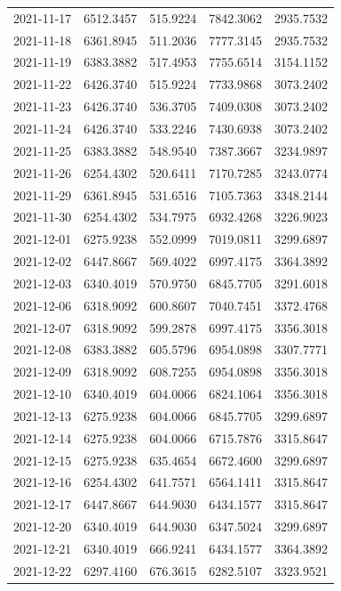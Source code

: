 \begin{footnotesize}
\begin{longtable}{lllll}
2021-11-17 & 6512.3457 & 515.9224 & 7842.3062 & 2935.7532 \\
2021-11-18 & 6361.8945 & 511.2036 & 7777.3145 & 2935.7532 \\
2021-11-19 & 6383.3882 & 517.4953 & 7755.6514 & 3154.1152 \\
2021-11-22 & 6426.3740 & 515.9224 & 7733.9868 & 3073.2402 \\
2021-11-23 & 6426.3740 & 536.3705 & 7409.0308 & 3073.2402 \\
2021-11-24 & 6426.3740 & 533.2246 & 7430.6938 & 3073.2402 \\
2021-11-25 & 6383.3882 & 548.9540 & 7387.3667 & 3234.9897 \\
2021-11-26 & 6254.4302 & 520.6411 & 7170.7285 & 3243.0774 \\
2021-11-29 & 6361.8945 & 531.6516 & 7105.7363 & 3348.2144 \\
2021-11-30 & 6254.4302 & 534.7975 & 6932.4268 & 3226.9023 \\
2021-12-01 & 6275.9238 & 552.0999 & 7019.0811 & 3299.6897 \\
2021-12-02 & 6447.8667 & 569.4022 & 6997.4175 & 3364.3892 \\
2021-12-03 & 6340.4019 & 570.9750 & 6845.7705 & 3291.6018 \\
2021-12-06 & 6318.9092 & 600.8607 & 7040.7451 & 3372.4768 \\
2021-12-07 & 6318.9092 & 599.2878 & 6997.4175 & 3356.3018 \\
2021-12-08 & 6383.3882 & 605.5796 & 6954.0898 & 3307.7771 \\
2021-12-09 & 6318.9092 & 608.7255 & 6954.0898 & 3356.3018 \\
2021-12-10 & 6340.4019 & 604.0066 & 6824.1064 & 3356.3018 \\
2021-12-13 & 6275.9238 & 604.0066 & 6845.7705 & 3299.6897 \\
2021-12-14 & 6275.9238 & 604.0066 & 6715.7876 & 3315.8647 \\
2021-12-15 & 6275.9238 & 635.4654 & 6672.4600 & 3299.6897 \\
2021-12-16 & 6254.4302 & 641.7571 & 6564.1411 & 3315.8647 \\
2021-12-17 & 6447.8667 & 644.9030 & 6434.1577 & 3315.8647 \\
2021-12-20 & 6340.4019 & 644.9030 & 6347.5024 & 3299.6897 \\
2021-12-21 & 6340.4019 & 666.9241 & 6434.1577 & 3364.3892 \\
2021-12-22 & 6297.4160 & 676.3615 & 6282.5107 & 3323.9521 \\

\end{longtable}
\end{footnotesize}
